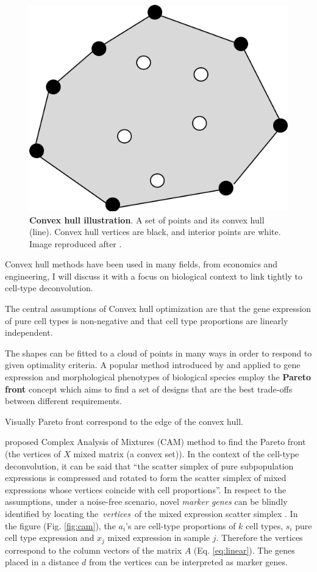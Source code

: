\documentclass[12pt,]{book}
\theoremstyle{definition}
\theoremstyle{definition}
\theoremstyle{definition}
\theoremstyle{remark}
\begin{document}
\begin{figure}

{\centering \includegraphics[width=0.5\linewidth]{figures-ext/convexhull} 

}

\caption[Convex hull illustration]{\textbf{Convex hull illustration}. A set of
points and its convex hull (line). Convex hull vertices are black, and
interior points are white. Image reproduced after \citet{Erickson2018}.}\label{fig:convexhull}
\end{figure}





Convex hull methods have been used in many fields, from economics and
engineering, I will discuss it with a focus on biological context to
link tightly to cell-type deconvolution.

The central assumptions of Convex hull optimization are that the gene
expression of pure cell types is non-negative and that cell type
proportions are linearly independent.

The shapes can be fitted to a cloud of points in many ways in order to
respond to given optimality criteria. A popular method introduced by
\citet{Shoval2012} and applied to gene expression and morphological
phenotypes of biological species employ the \textbf{Pareto front}
concept which aims to find a set of designs that are the best trade-offs
between different requirements.

Visually Pareto front correspond to the edge of the convex hull.

\citet{Wang2013} proposed Complex Analysis of Mixtures (CAM) method to
find the Pareto front (the vertices of \(X\) mixed matrix (a convex
set)). In the context of the cell-type deconvolution, it can be said
that ``the scatter simplex of pure subpopulation expressions is
compressed and rotated to form the scatter simplex of mixed expressions
whose vertices coincide with cell proportions''\citep{Wang2016}. In
respect to the assumptions, under a noise-free scenario, novel
\emph{marker genes} can be blindly identified by locating
the~\emph{vertices}~of the mixed expression scatter simplex
\citep{Wang2010}. In the figure (Fig. \ref{fig:cam}), the \(a_i\)'s are
cell-type proportions of \(k\) cell types, \(s_i\) pure cell type
expression and \(x_j\) mixed expression in sample \(j\). Therefore the
vertices correspond to the column vectors of the matrix \(A\) (Eq.
\eqref{eq:linear}). The genes placed in a distance \(d\) from the vertices
can be interpreted as marker genes.
\end{document}
